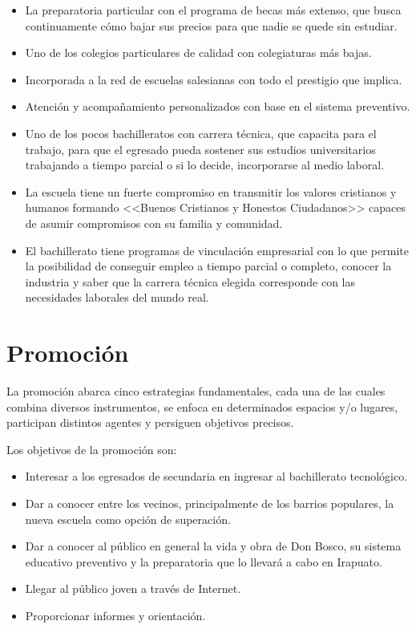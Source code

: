 \begin{itemize}
	\item
	La preparatoria particular con el programa de becas más extenso, que busca continuamente cómo bajar sus precios para que nadie se quede sin estudiar.
	\item
	Uno de los colegios particulares de calidad con colegiaturas más bajas.
	\item
	Incorporada a la red de escuelas salesianas con todo el prestigio que implica.
	\item
	Atención y acompañamiento personalizados con base en el sistema preventivo.
	\item
	Uno de los pocos bachilleratos con carrera técnica, que capacita para el trabajo, para que el egresado pueda sostener sus estudios universitarios trabajando a tiempo parcial o si lo decide, incorporarse al medio laboral.
	\item
	La escuela tiene un fuerte compromiso en transmitir los valores cristianos y humanos formando <<Buenos Cristianos y Honestos Ciudadanos>> capaces de asumir compromisos con su familia y comunidad.
	\item
	El bachillerato tiene programas de vinculación empresarial con lo que permite la posibilidad de conseguir empleo a tiempo parcial o completo, conocer la industria y saber que la carrera técnica elegida corresponde con las necesidades laborales del mundo real.
\end{itemize}

\section{Promoción}

La promoción abarca cinco estrategias fundamentales, cada una de las cuales combina diversos instrumentos, se enfoca en determinados espacios y/o lugares, participan distintos agentes y persiguen objetivos precisos.

Los objetivos de la promoción son:

\begin{itemize}
	\item Interesar a los egresados de secundaria en ingresar al bachillerato tecnológico.
	\item Dar a conocer entre los vecinos, principalmente de los barrios populares, la nueva escuela como opción de superación.
	\item Dar a conocer al público en general la vida y obra de Don Bosco, su sistema educativo preventivo y la preparatoria que lo llevará a cabo en Irapuato.
	\item Llegar al público joven a través de Internet.
	\item Proporcionar informes y orientación.
\end{itemize}


